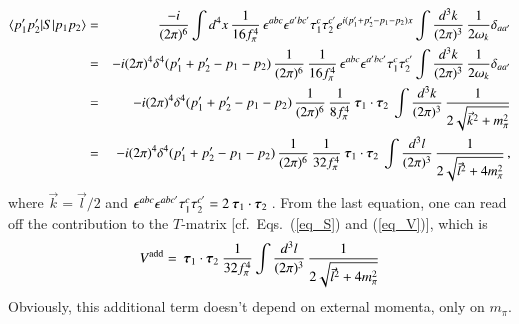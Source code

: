 \documentclass[sort&compress,preprint,3p]{elsarticle}
\newcommand{\bbox}[1]{\mbox{\boldmath $#1$}}
\begin{document}
\begin{eqnarray}
\langle p'_1 p'_2 | S | p_1 p_2 \rangle &=&
\frac{-i}{(2\pi)^6} \int d^4 x\,
\frac{1}{16f_\pi^4} \,
\epsilon^{abc} \epsilon^{a'bc'} \tau^c_1 \tau^{c'}_2 
e^{i(p'_1+p'_2-p_1-p_2) x}
\int \frac{d^3 k}{(2\pi)^3} \, \frac{1}{2\omega_k}
\delta_{aa'}
\nonumber \\ &=&
-i (2\pi)^4 \delta^4 (p'_1+p'_2-p_1-p_2)
\, \frac{1}{(2\pi)^6} \,
\frac{1}{16f_\pi^4} \,
\epsilon^{abc} \epsilon^{a'bc'} \tau^c_1 \tau^{c'}_2 
\int \frac{d^3 k}{(2\pi)^3} \, \frac{1}{2\omega_k}
\delta_{aa'}
\nonumber \\ &=&
-i (2\pi)^4 \delta^4 (p'_1+p'_2-p_1-p_2)
\, \frac{1}{(2\pi)^6} \,
\frac{1}{8f_\pi^4} 
\: \bbox{\tau}_1 \cdot \bbox{\tau}_2 \:
\int \frac{d^3 k}{(2\pi)^3} \, \frac{1}{2\sqrt{\vec{k}^2+m_\pi^2}}
\nonumber \\ &=&
-i (2\pi)^4 \delta^4 (p'_1+p'_2-p_1-p_2)
\, \frac{1}{(2\pi)^6} \,
\frac{1}{32f_\pi^4} 
\: \bbox{\tau}_1 \cdot \bbox{\tau}_2 \:
\int \frac{d^3 l}{(2\pi)^3} \, \frac{1}{2\sqrt{{\vec l}^2+4m_\pi^2}}
\,,
\nonumber \\ 
\label{eq_S2}
\end{eqnarray}
where $\vec k=\vec l/2$ and
$\epsilon^{abc} \epsilon^{abc'} \tau^c_1 \tau^{c'}_2 = 2
\: \bbox{\tau}_1 \cdot \bbox{\tau}_2 \:$.
From the last equation, one can read off the contribution to the $T$-matrix
[cf.\ Eqs.~(\ref{eq_S}) and (\ref{eq_V})],
which is 
\begin{equation}
V^{\rm add} = 
\: \bbox{\tau}_1 \cdot \bbox{\tau}_2 \:
\frac{1}{32f_\pi^4} 
\int \frac{d^3 l}{(2\pi)^3} \, \frac{1}{2\sqrt{\vec l^2+4m_\pi^2}}
\label{eq_add}
\end{equation}
Obviously, this additional term
doesn't depend on external momenta, only on $m_\pi$.
\end{document}
